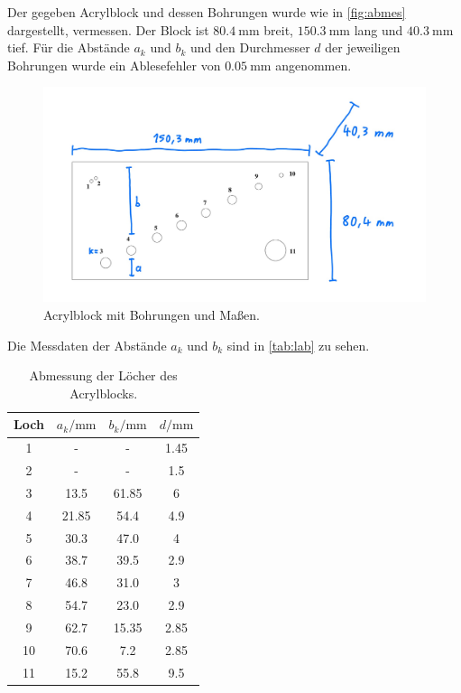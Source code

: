 Der gegeben Acrylblock und dessen Bohrungen wurde wie in \autoref{fig:abmes} dargestellt, vermessen.
Der Block ist $\SI{80.4}{\milli\meter}$ breit, $\SI{150.3}{\milli\meter}$ lang und $\SI{40.3}{\milli\meter}$ tief.
Für die Abstände $a_k$ und $b_k$ und den Durchmesser $d$ der jeweiligen Bohrungen wurde ein Ablesefehler von $\SI{0.05}{\milli\meter}$
angenommen.
\begin{figure}[H]
    \centering
    \includegraphics[width=0.9\linewidth]{content/grafik/abmessung.jpg}
	\captionsetup{width=0.765\linewidth}
	\caption{Acrylblock mit Bohrungen und Maßen. \cite{scan}}
    \label{fig:abmes}
\end{figure}
Die Messdaten der Abstände $a_k$ und $b_k$ sind in \autoref{tab:lab} zu sehen. 
\begin{table}[H]
    \centering
    \caption{Abmessung der Löcher des Acrylblocks.}
    \label{tab:lab}
\begin{tabular}{c c c c}
    \toprule
    Loch & $a_k / \si{\milli\meter}$ & $b_k / \si{\milli\meter}$ & $d / \si{\milli\meter}$\\
    \midrule
    1 &   -  &    -   & 1.45 \\
    2 &   -  &    -   & 1.5 \\
    3 & 13.5 & 61.85 &    6  \\
    4 &21.85 &  54.4 &  4.9  \\
    5 &30.3 &  47.0 &    4  \\
    6 & 38.7 &  39.5 &  2.9  \\
    7 &46.8 &  31.0 &    3  \\
    8 &54.7 &  23.0 &  2.9  \\
    9 & 62.7 & 15.35 & 2.85  \\
    10 & 70.6 &   7.2 & 2.85  \\
    11 &15.2 &  55.8 &  9.5 \\
    \bottomrule
    \end{tabular}
\end{table}

